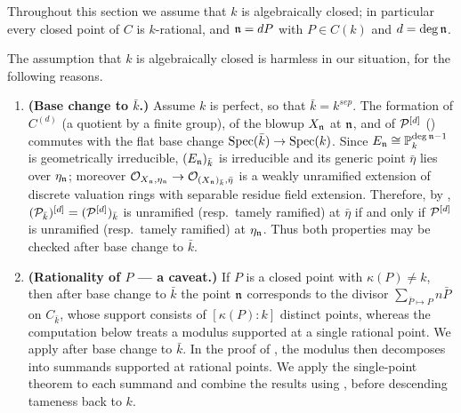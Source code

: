 Throughout this section we assume that $k$ is algebraically closed; in particular every closed point of $C$ is $k$-rational, and $\mathfrak{n} = dP$ with $P \in C(k)$ and $d = \deg \mathfrak{n}$.

\begin{rem*}
    The assumption that $k$ is algebraically closed is harmless in our situation, for the following reasons.
    \begin{enumerate}
        \item \textbf{(Base change to $\bar{k}$.)} Assume $k$ is perfect, so that $\bar{k}=k^{sep}$.
        The formation of $C^{(d)}$ (a quotient by a finite group), of the blowup $X_{\mathfrak{n}}$ at $\mathfrak{n}$, and of
        $\mathcal{P}^{[d]}$ () commutes with the flat base change $\operatorname{Spec}(\bar{k}) \to \operatorname{Spec}(k)$.
        Since $E_{\mathfrak{n}} \cong \mathbb{P}^{\deg \mathfrak{n} - 1}_k$ is geometrically irreducible, $(E_{\mathfrak{n}})_{\bar{k}}$ is irreducible
        and its generic point $\bar{\eta}$ lies over $\eta_{\mathfrak{n}}$; moreover
        $\mathcal{O}_{X_{\mathfrak{n}}, \eta_{\mathfrak{n}}} \to \mathcal{O}_{(X_{\mathfrak{n}})_{\bar{k}}, \bar{\eta}}$ is a weakly unramified extension of discrete
        valuation rings with separable residue field extension. Therefore, by
        ,
        $(\mathcal{P}_{\bar{k}})^{[d]}=(\mathcal{P}^{[d]})_{\bar{k}}$ is unramified
        (resp.\ tamely ramified) at $\bar{\eta}$ if and only if
        $\mathcal{P}^{[d]}$ is unramified (resp.\ tamely ramified) at $\eta_{\mathfrak{n}}$.
        Thus both properties may be checked after base change to $\bar{k}$.
        \item \textbf{(Rationality of $P$ --- a caveat.)} If $P$ is a closed point with $\kappa(P) \neq k$, then after base
        change to $\bar{k}$ the point $\mathfrak{n}$ corresponds to the divisor $\sum_{\bar{P} \mapsto P} n \bar{P}$ on
        $C_{\bar{k}}$, whose support consists of $[\kappa(P):k]$ distinct points, whereas the computation below treats a
        modulus supported at a single rational point.
        We apply  after base
        change to $\bar{k}$. In the proof of
        , the modulus
        then decomposes into summands supported at rational points. We apply
        the single-point theorem to each summand and combine the results
        using , before descending tameness back
        to $k$.
    \end{enumerate}
\end{rem*}

